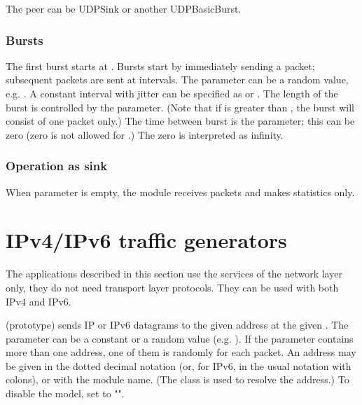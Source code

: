 The peer can be UDPSink or another UDPBasicBurst.

\subsubsection*{Bursts}

The first burst starts at . Bursts start by immediately sending
a packet; subsequent packets are sent at  intervals. The
 parameter can be a random value, e.g. .
A constant interval with jitter can be specified as 
or . The length of the burst is controlled by the
 parameter. (Note that if  is greater than
, the burst will consist of one packet only.) The time between
burst is the  parameter; this can be zero (zero is not
allowed for .) The zero  is interpreted as infinity.

\subsubsection*{Operation as sink}

When  parameter is empty, the module receives packets and makes statistics only.


\section{IPv4/IPv6 traffic generators}
\label{sec:apps:ipv4/ipv6-traffic-generators}

The applications described in this section use the services of the network
layer only, they do not need transport layer protocols.
They can be used with both IPv4 and IPv6.

 (prototype) sends IP or IPv6 datagrams to the
given address at the given .
The  parameter can be a constant or a random value (e.g.
). If the  parameter contains more than
one address, one of them is randomly for each packet. An address may be given in
the dotted decimal notation (or, for IPv6, in the usual notation with colons),
or with the module name. (The  class is used to
resolve the address.) To disable the model, set  to "".


